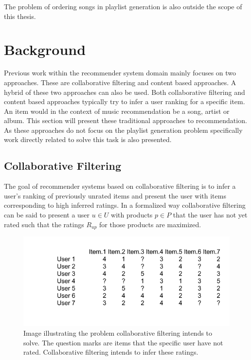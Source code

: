 \documentclass[a4paper,11pt]{kth-mag}
\begin{document}
  The problem of ordering songs in playlist generation is also outside the scope of this thesis. 

\chapter{Background}

Previous work within the recommender system domain mainly focuses on two approaches. These are collaborative filtering and content based approaches. A hybrid of these two approaches can also be used. Both collaborative filtering and content based approaches typically try to infer a user ranking for a specific item\cite{melville2002content}. An item would in the context of music recommendation be a song, artist or album. This section will present these traditional approaches to recommendation. As these approaches do not focus on the playlist generation problem specifically work directly related to solve this task is also presented.

\section{Collaborative Filtering}
The goal of recommender systems based on collaborative filtering is to infer a user's ranking of previously unrated items and present the user with items corresponding to high inferred ratings. In a formalized way collaborative filtering can be said to present a user $u \in U$ with products $p \in P$ that the user has not yet rated such that the ratings $R_{up}$ for those products are maximized\cite{breese1998empirical}.

\begin{figure}
\centering
\includegraphics[scale=0.6]{images/colFiltMat.png}
\caption{Image illustrating the problem collaborative filtering intends to solve. The question marks are items that the specific user have not rated. Collaborative filtering intends to infer these ratings.}
\label{colFiltMatImg}
\end{figure}
\end{document}
